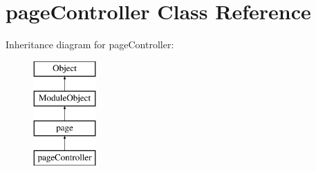 \hypertarget{classpageController}{}\section{page\+Controller Class Reference}
\label{classpageController}
Inheritance diagram for page\+Controller\+:\begin{figure}[H]
\begin{center}
\leavevmode
\includegraphics[height=4.000000cm]{classpageController}
\end{center}
\end{figure}
